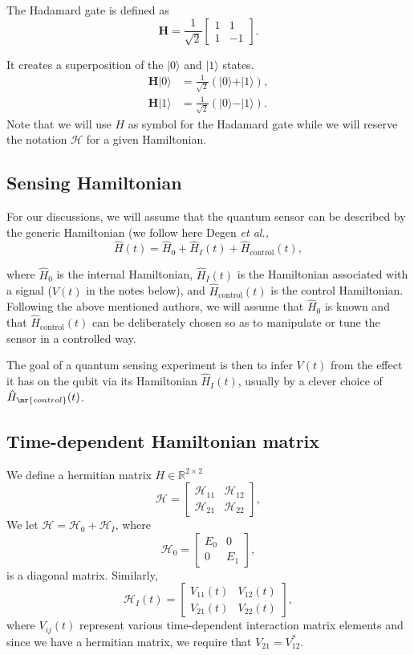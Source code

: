 \documentclass[%
oneside,                 %
final,                   %
10pt]{article}
\begin{document}
The Hadamard gate is defined as
\[
	\bm{H} = \frac{1}{\sqrt{2}} \begin{bmatrix}
		1 & 1 \\
		1 & -1
	\end{bmatrix}.
\]

It creates a superposition of the $ \vert 0\rangle $ and $ \vert 1\rangle $ states.
\begin{align}
	\bm{H}\vert 0\rangle &= \frac{1}{\sqrt{2}} \left( \vert 0\rangle + \vert 1\rangle \right), \\
	\bm{H}\vert 1\rangle &= \frac{1}{\sqrt{2}} \left( \vert 0\rangle - \vert 1\rangle \right).
\end{align}
Note that we will use $H$ as symbol for the Hadamard gate while we will reserve the notation $\mathcal{H}$ for a given Hamiltonian.

\subsection{Sensing Hamiltonian}

For our discussions, we will assume that the quantum sensor can be
described by the generic Hamiltonian (we follow here Degen \emph{et al.,}
\[
\hat{H}(t) = \hat{H}_0 + \hat{H}_I(t) + \hat{H}_\mathrm{control}(t),
\]

where $\hat{H}_0$ is the internal Hamiltonian, $\hat{H}_I(t)$ is the
Hamiltonian associated with a signal ($V(t)$ in the notes below), and
$\hat{H}_\mathrm{control}(t)$ is the control Hamiltonian.  Following the above mentioned authors, we  will assume
that $\hat{H}_0$ is known and that $\hat{H}_\mathrm{control}(t)$ can be
deliberately chosen so as to manipulate or tune the sensor in a
controlled way.

The goal of a quantum sensing experiment is then to
infer $V(t)$ from the effect it has on the qubit via its Hamiltonian
$\hat{H}_I(t)$, usually by a clever choice of
$\hat{H}_\mr{control}(t)$.

\subsection{Time-dependent Hamiltonian matrix}

We define a  hermitian  matrix  $H\in {\mathbb{R}}^{2\times 2}$
\[
\mathcal{H} = \begin{bmatrix} \mathcal{H}_{11} & \mathcal{H}_{12} \\ \mathcal{H}_{21} & \mathcal{H}_{22}
\end{bmatrix},
\]
We  let $\mathcal{H} = \mathcal{H}_0 + \mathcal{H}_I$, where
\[
\mathcal{H}_0= \begin{bmatrix} E_0 & 0 \\ 0 & E_1\end{bmatrix},
\]
is a diagonal matrix. Similarly,
\[
\mathcal{H}_I(t)= \begin{bmatrix} V_{11}(t) & V_{12}(t) \\ V_{21}(t) & V_{22}(t)\end{bmatrix},
\]
where $V_{ij}(t)$ represent various time-dependent interaction matrix elements and since we have a hermitian matrix, we require that
$V_{21}=V_{12}^*$.
\end{document}
